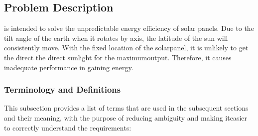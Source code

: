 \documentclass[12pt]{article}
\begin{document}
\subsection{Problem Description} \label{Sec_pd}

\progname is intended to solve the unpredictable energy efficiency of solar
panels.  Due to the tilt angle of the earth when it rotates by axis, the
latitude of the sun will consistently move. With the fixed location of the
solarpanel, it is unlikely to get the direct the direct sunlight for the
maximumoutput. Therefore, it causes inadequate performance in gaining energy.

\subsubsection{Terminology and  Definitions}


This subsection provides a list of terms that are used in the subsequent
sections and their meaning, with the purpose of reducing ambiguity and making
iteasier to correctly understand the requirements:
\end{document}

